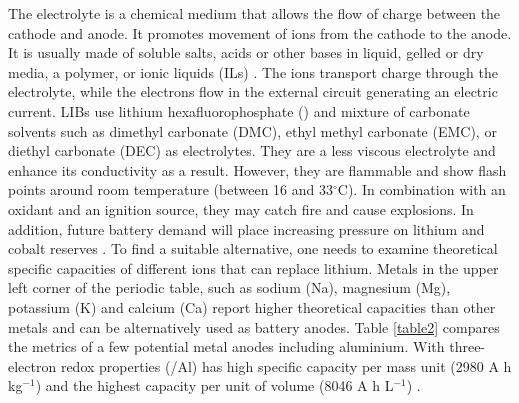 \vspace{3mm}
The electrolyte is a chemical medium that allows the flow of charge between the cathode and anode. It promotes movement of ions from the cathode to the anode. It is usually made of soluble salts, acids or other bases in liquid, gelled or dry media, a polymer, or ionic liquids (ILs) \cite{xu_nonaqueous_2004, armand_ionic-liquid_2009, croce_nanocomposite_1998}. The ions transport charge through the electrolyte, while the electrons flow in the external circuit generating an electric current. LIBs use lithium hexafluorophosphate () and mixture of carbonate solvents such as dimethyl carbonate (DMC), ethyl methyl carbonate (EMC), or diethyl carbonate (DEC) as electrolytes. They are a less viscous electrolyte and enhance its conductivity as a result. However, they are flammable and show flash points around room temperature (between 16 and 33$^{\circ}$C). In combination with an oxidant and an ignition source, they may catch fire and cause explosions. In addition, future battery demand will place increasing pressure on lithium and cobalt reserves \cite{turcheniuk_ten_2018}. To find a suitable alternative, one needs to examine theoretical specific capacities of different ions that can replace lithium. Metals in the upper left corner of the periodic table, such as sodium (Na), magnesium (Mg), potassium (K) and calcium (Ca) report higher theoretical capacities than other metals and can be alternatively used as battery anodes. Table  \ref{table2} compares the metrics of a few potential metal anodes including aluminium. With three-electron redox properties (/Al) has high specific capacity per mass unit (2980 A h kg$^{-1}$) and the highest capacity per unit of volume (8046 A h L$^{-1}$) \cite{ambroz_trends_2017}.

